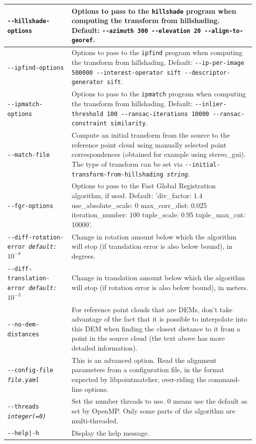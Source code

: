 \begin{longtable}{|p{8cm}|p{9cm}|}
\texttt{-\/-hillshade-options} & Options to pass to the \texttt{hillshade} program when computing the transform from hillshading. Default: \texttt{-\/-azimuth 300 -\/-elevation 20 -\/-align-to-georef}. \\ \hline

\texttt{-\/-ipfind-options} & Options to pass to the \texttt{ipfind} program when computing the transform from hillshading. Default: \texttt{-\/-ip-per-image 500000 -\/-interest-operator sift -\/-descriptor-generator sift}. \\ \hline

\texttt{-\/-ipmatch-options} & Options to pass to the \texttt{ipmatch} program when computing the transform from hillshading. Default: \texttt{-\/-inlier-threshold 100 -\/-ransac-iterations 10000 -\/-ransac-constraint similarity}. \\ \hline

\texttt{-\/-match-file} & Compute an initial transform from the source to the reference point cloud using manually selected point correspondences (obtained for example using stereo\_gui).  The type of transform can be set via \texttt{-\/-initial-transform-from-hillshading \textit{string}}.\\ \hline

\texttt{-\/-fgr-options} & Options to pass to the Fast Global Registration algorithm, if used. Default: 'div\_factor: 1.4 use\_absolute\_scale: 0 max\_corr\_dist: 0.025 iteration\_number: 100 tuple\_scale: 0.95 tuple\_max\_cnt: 10000'. \\ \hline

\texttt{-\/-diff-rotation-error \textit{default: $10^{-8}$}} & Change in rotation amount below which the algorithm will stop (if translation error is also below bound), in degrees. \\ \hline
\texttt{-\/-diff-translation-error \textit{default: $10^{-3}$}} & Change in translation amount below which the algorithm will stop (if rotation error is also below bound), in meters. \\ \hline

\texttt{-\/-no-dem-distances} & For reference point clouds that are DEMs, don't take advantage of the fact that it is possible to interpolate into this DEM when finding the closest distance to it from a point in the source cloud (the text above has more detailed information). \\ \hline

\texttt{-\/-config-file \textit{file.yaml}} & This is an advanced
option. Read the alignment parameters from a configuration file, in the
format expected by libpointmatcher, over-riding the command-line options.\\ \hline

\texttt{-\/-threads \textit{integer(=0)}} & Set the number threads to
use. 0 means use the default as set by OpenMP. Only some parts of the algorithm are multi-threaded.\\ \hline

\texttt{-\/-help|-h} & Display the help message.\\ \hline
\end{longtable}

